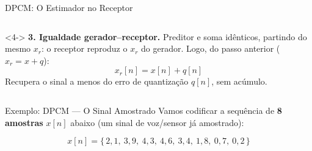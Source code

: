 \begin{frame}{DPCM: O Estimador no Receptor}
\begin{columns}[c]
    \begin{onlyenv}<4->
      \textbf{3. Igualdade gerador--receptor.}
      {\footnotesize Preditor e soma idênticos, partindo do mesmo $x_r$:
      o receptor reproduz o $x_r$ do gerador.} Logo, do passo anterior
      ($x_r = x + q$):
      \vspace{-0.1cm}
      \[ \boxed{\,x_r[n] = x[n] + q[n]\,} \]
      {\footnotesize Recupera o sinal a menos do erro de quantização $q[n]$,
      sem acúmulo.}
    \end{onlyenv}
  \end{columns}
\end{frame}


\begin{frame}{Exemplo: DPCM — O Sinal Amostrado}
  Vamos codificar a sequência de \textbf{8 amostras} $x[n]$ abaixo (um sinal
  de voz/sensor já amostrado):

  \vspace{0.05cm}
  \begin{center}
  \end{center}

  \[
    x[n] = \{\,2{,}1,\ 3{,}9,\ 4{,}3,\ 4{,}6,\ 3{,}4,\ 1{,}8,\ 0{,}7,\ 0{,}2\,\}
  \]
\end{frame}


